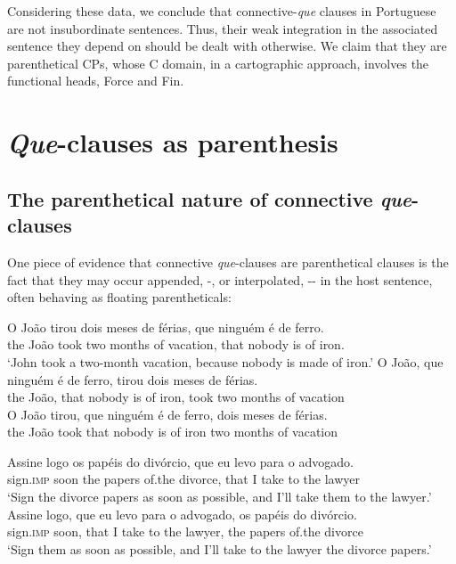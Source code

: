 \documentclass[output=paper,colorlinks,citecolor=brown,
]{langscibook}
\begin{document}
Considering these data, we conclude that connective-\textit{que} clauses in Portuguese are not insubordinate sentences. Thus, their weak integration in the associated sentence they depend on should be dealt with otherwise. We claim that they are parenthetical CPs, whose C domain, in a cartographic approach, involves the functional heads, Force and Fin.  

\section{\textit{Que}-clauses as parenthesis} \label{sec:matos:sect5}

\subsection{The parenthetical nature of connective \textit{que}-clauses} \label{sec:matos:sect5-1}

One piece of evidence that connective \textit{que}-clauses are parenthetical clauses is the fact that they may occur appended, -, or interpolated, -- in the host sentence, often behaving as floating parentheticals:

\ea \label{ex:matos:joao-ferro}
 \ea \label{ex:matos:joao-ferro-a}
 \gll O João tirou dois meses de férias, que ninguém é de ferro.\\
	  the João took two months of vacation, that nobody is of iron.\\ 
 \glt ‘John took a two-month vacation, because nobody is made of iron.’
 \ex \label{ex:matos:joao-ferro-b}
 \gll O João, que ninguém é de ferro, tirou dois meses de férias.\\
	  the João, that nobody is of iron, took two months of vacation\\
 \ex \label{ex:matos:joao-ferro-c}
 \gll O João tirou, que ninguém é de ferro, dois meses de férias.\\
	  the João took that nobody is of iron two months of vacation\\
 \z
\z

\ea \label{ex:matos:assine-logo}
 \ea \label{ex:matos:assine-logo-a}
 \gll Assine logo os papéis do divórcio, que eu levo para o advogado.\\
      sign.\textsc{imp} soon the papers of.the divorce, that I take to the lawyer\\
 \glt ‘Sign the divorce papers as soon as possible, and I’ll take them to the lawyer.’  
 \ex \label{ex:matos:assine-logo-b}
 \gll Assine logo, que eu levo para o advogado, os papéis do divórcio.\\
	  sign.\textsc{imp} soon, that I take to the lawyer, the papers of.the divorce\\
 \glt ‘Sign them as soon as possible, and I’ll take to the lawyer the divorce papers.’
 \z
\z 
\end{document}
